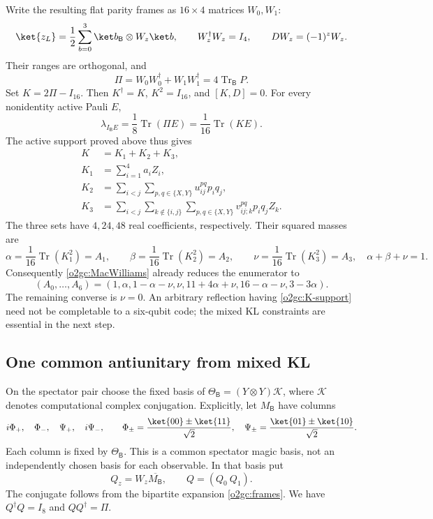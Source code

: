 Write the resulting flat parity frames as \(16\times4\) matrices
\(W_0,W_1\):
\begin{equation}
 \ket{z_L}=\frac12\sum_{b=0}^3\ket b_{\mathsf B}\otimes W_z\ket b,
 \qquad W_z^\dagger W_z=I_4,\qquad DW_z=(-1)^zW_z.
 \label{o2gc:frames}
\end{equation}
Their ranges are orthogonal, and
\[
 \Pi=W_0W_0^\dagger+W_1W_1^\dagger
     =4\operatorname{Tr}_{\mathsf B}P.
\]
Set \(K=2\Pi-I_{16}\). Then \(K^\dagger=K\), \(K^2=I_{16}\), and
\([K,D]=0\). For every nonidentity active Pauli \(E\),
\begin{equation}
 \lambda_{I_{\mathsf B}E}
 =\frac18\operatorname{Tr}(\Pi E)
 =\frac1{16}\operatorname{Tr}(KE).
 \label{o2gc:normalization}
\end{equation}
The active support proved above thus gives
\begin{align}
 K&=K_1+K_2+K_3,\label{o2gc:K-support}\\
 K_1&=\sum_{i=1}^4a_iZ_i,\nonumber\\
 K_2&=\sum_{i<j}\sum_{p,q\in\{X,Y\}}u_{ij}^{pq}p_iq_j,\nonumber\\
 K_3&=\sum_{i<j}\sum_{k\notin\{i,j\}}
              \sum_{p,q\in\{X,Y\}}v_{ij;k}^{pq}p_iq_jZ_k.\nonumber
\end{align}
The three sets have \(4,24,48\) real coefficients, respectively. Their
squared masses are
\begin{equation}
 \alpha=\frac1{16}\operatorname{Tr}(K_1^2)=A_1,\qquad
 \beta=\frac1{16}\operatorname{Tr}(K_2^2)=A_2,\qquad
 \nu=\frac1{16}\operatorname{Tr}(K_3^2)=A_3,
 \quad \alpha+\beta+\nu=1.
 \label{o2gc:masses}
\end{equation}
Consequently \eqref{o2gc:MacWilliams} already reduces the enumerator to
\begin{equation}
 (A_0,\ldots,A_6)=
 (1,\alpha,1-\alpha-\nu,\nu,
   11+4\alpha+\nu,16-\alpha-\nu,3-3\alpha).
 \label{o2gc:plane}
\end{equation}
The remaining converse is \(\nu=0\). An arbitrary reflection having
\eqref{o2gc:K-support} need not be completable to a six-qubit code; the
mixed KL constraints are essential in the next step.

\subsection{One common antiunitary from mixed KL}
\label{o2gc:subsec-commonJ}

On the spectator pair choose the fixed basis of
\(\Theta_{\mathsf B}=(Y\otimes Y)\mathcal K\), where \(\mathcal K\)
denotes computational complex conjugation. Explicitly, let \(M_{\mathsf B}\)
have columns
\[
 i\Phi_+,\quad\Phi_-,\quad\Psi_+,\quad i\Psi_-,
 \qquad
 \Phi_\pm=\frac{\ket{00}\pm\ket{11}}{\sqrt2},\quad
 \Psi_\pm=\frac{\ket{01}\pm\ket{10}}{\sqrt2}.
\]
Each column is fixed by \(\Theta_{\mathsf B}\). This is a common
spectator magic basis, not an independently chosen basis for each
observable. In that basis put
\[
 Q_z=W_z\overline{M_{\mathsf B}},\qquad Q=(Q_0\ Q_1).
\]
The conjugate follows from the bipartite expansion
\eqref{o2gc:frames}. We have \(Q^\dagger Q=I_8\) and \(QQ^\dagger=\Pi\).

